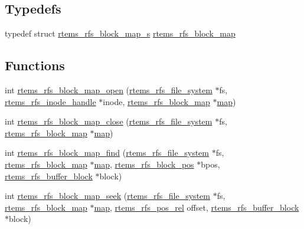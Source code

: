 \subsection*{Typedefs}
\begin{DoxyCompactItemize}
\item 
typedef struct \mbox{\hyperlink{structrtems__rfs__block__map__s}{rtems\+\_\+rfs\+\_\+block\+\_\+map\+\_\+s}} \mbox{\hyperlink{rtems-rfs-block_8h_af488270acef452a961e888bffdc3a7bf}{rtems\+\_\+rfs\+\_\+block\+\_\+map}}
\end{DoxyCompactItemize}
\subsection*{Functions}
\begin{DoxyCompactItemize}
\item 
int \mbox{\hyperlink{rtems-rfs-block_8h_a5a09f0d3d9d4e31367c51ceadb7dea31}{rtems\+\_\+rfs\+\_\+block\+\_\+map\+\_\+open}} (\mbox{\hyperlink{struct__rtems__rfs__file__system}{rtems\+\_\+rfs\+\_\+file\+\_\+system}} $\ast$fs, \mbox{\hyperlink{rtems-rfs-inode_8h_a91f02dac5a2d91e072d676f3266ab8d2}{rtems\+\_\+rfs\+\_\+inode\+\_\+handle}} $\ast$inode, \mbox{\hyperlink{rtems-rfs-block_8h_af488270acef452a961e888bffdc3a7bf}{rtems\+\_\+rfs\+\_\+block\+\_\+map}} $\ast$\mbox{\hyperlink{struct__map}{map}})
\item 
int \mbox{\hyperlink{rtems-rfs-block_8h_a9f3eaf881c5744fcfe5798cea33999a7}{rtems\+\_\+rfs\+\_\+block\+\_\+map\+\_\+close}} (\mbox{\hyperlink{struct__rtems__rfs__file__system}{rtems\+\_\+rfs\+\_\+file\+\_\+system}} $\ast$fs, \mbox{\hyperlink{rtems-rfs-block_8h_af488270acef452a961e888bffdc3a7bf}{rtems\+\_\+rfs\+\_\+block\+\_\+map}} $\ast$\mbox{\hyperlink{struct__map}{map}})
\item 
int \mbox{\hyperlink{rtems-rfs-block_8h_a28b8212558166f369beb68e4bd28d528}{rtems\+\_\+rfs\+\_\+block\+\_\+map\+\_\+find}} (\mbox{\hyperlink{struct__rtems__rfs__file__system}{rtems\+\_\+rfs\+\_\+file\+\_\+system}} $\ast$fs, \mbox{\hyperlink{rtems-rfs-block_8h_af488270acef452a961e888bffdc3a7bf}{rtems\+\_\+rfs\+\_\+block\+\_\+map}} $\ast$\mbox{\hyperlink{struct__map}{map}}, \mbox{\hyperlink{rtems-rfs-block-pos_8h_a0d8bd7482333e584a03df45e60cda226}{rtems\+\_\+rfs\+\_\+block\+\_\+pos}} $\ast$bpos, \mbox{\hyperlink{rtems-rfs-buffer_8h_a5650d53328a5af0a78198fe780aec043}{rtems\+\_\+rfs\+\_\+buffer\+\_\+block}} $\ast$block)
\item 
int \mbox{\hyperlink{rtems-rfs-block_8h_a0d34276d2ea32d86916a57cf34266c0f}{rtems\+\_\+rfs\+\_\+block\+\_\+map\+\_\+seek}} (\mbox{\hyperlink{struct__rtems__rfs__file__system}{rtems\+\_\+rfs\+\_\+file\+\_\+system}} $\ast$fs, \mbox{\hyperlink{rtems-rfs-block_8h_af488270acef452a961e888bffdc3a7bf}{rtems\+\_\+rfs\+\_\+block\+\_\+map}} $\ast$\mbox{\hyperlink{struct__map}{map}}, \mbox{\hyperlink{rtems-rfs-file-system_8h_af6bccb465dcd34c68e9f0c214950ef57}{rtems\+\_\+rfs\+\_\+pos\+\_\+rel}} offset, \mbox{\hyperlink{rtems-rfs-buffer_8h_a5650d53328a5af0a78198fe780aec043}{rtems\+\_\+rfs\+\_\+buffer\+\_\+block}} $\ast$block)

\end{DoxyCompactItemize}
